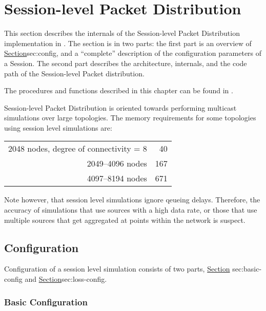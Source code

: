 \chapter{Session-level Packet Distribution}
\label{chap:session}

This section describes the internals of the Session-level Packet Distribution
implementation in \ns.
The section is in two parts:
the first part is an overview of 
\href{Session configuration}{Section}{sec:config},
and a ``complete'' description of the configuration parameters 
of a Session.
The second part describes the architecture, internals, and the code path
of the Session-level Packet distribution.

The procedures and functions described in this chapter can be found in
.

Session-level Packet Distribution is oriented towards
performing multicast simulations over large topologies.
The memory requirements for some topologies using
session level simulations are:

\begin{tabular}{r @{~~~$\approx$~} r@{\,MB}}
2048 nodes, degree of connectivity = 8 & 40 \\
2049--4096 nodes & 167 \\
4097--8194 nodes & 671 \\
\end{tabular}

Note however, that session level simulations ignore qeueing delays.
Therefore, the accuracy of
simulations that use sources with a high data rate,
or those that use multiple sources that get aggregated at points
within the network is suspect.

\section{Configuration}
\label{sec:config}

Configuration of a session level simulation consists of two parts,
\href{configuration of the session level details themselves}{Section}{%
        sec:basic-config}
and 
\href{adding loss and error models to the session level abstraction
to model specific behaviours}{Section}{sec:loss-config}.

\subsection{Basic Configuration}
\label{sec:basic-config}

